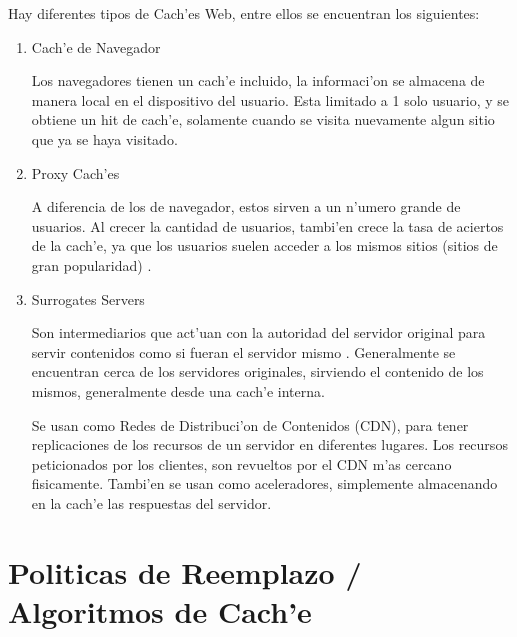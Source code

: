 Hay diferentes tipos de Cach'es Web, entre ellos se encuentran los siguientes:

\begin{enumerate}
\item Cach'e de Navegador

Los navegadores tienen un cach'e incluido, la informaci'on se almacena de manera local en el dispositivo del usuario. Esta limitado a 1 solo usuario, y se obtiene un hit de cach'e, solamente cuando se visita nuevamente algun sitio que ya se haya visitado.
\item Proxy Cach'es

A diferencia de los de navegador, estos sirven a un n'umero grande de usuarios. Al crecer la cantidad de usuarios, tambi'en crece la tasa de aciertos de la cach'e, ya que los usuarios suelen acceder a los mismos sitios (sitios de gran popularidad) \citep{duska}.
\item Surrogates Servers

Son intermediarios que act'uan con la autoridad del servidor original para servir contenidos como si fueran el servidor mismo \citep{edgeArch}. Generalmente se encuentran cerca de los servidores originales, sirviendo el contenido de los mismos, generalmente desde una cach'e interna.

Se usan como Redes de Distribuci'on de Contenidos (CDN), para tener replicaciones de los recursos de un servidor en diferentes lugares. Los recursos peticionados por los clientes, son revueltos por el CDN m'as cercano fisicamente. Tambi'en se usan como aceleradores, simplemente almacenando en la cach'e las respuestas del servidor.
\end{enumerate}

\section{Politicas de Reemplazo / Algoritmos de Cach'e}

